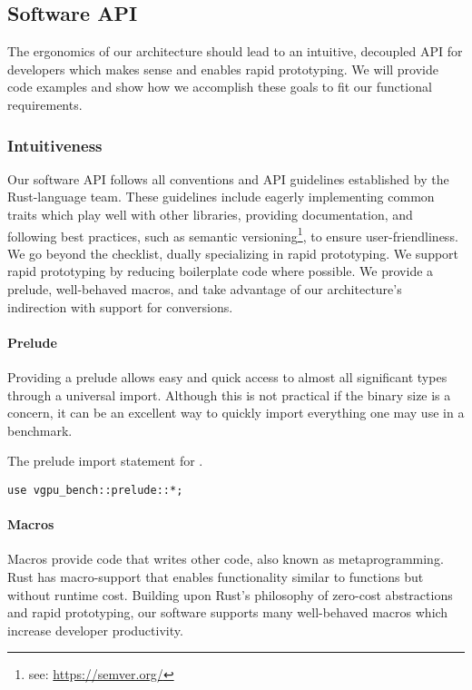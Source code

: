 \subsection{Software API}
The ergonomics of our architecture should lead to an intuitive, decoupled API for developers which makes sense and enables rapid prototyping. We will provide code examples and show how we accomplish these goals to fit our functional requirements.

\subsubsection{Intuitiveness}
Our software API follows all conventions and API guidelines established by the Rust-language team\cite{ApiGuidelines22}. These guidelines include eagerly implementing common traits which play well with other libraries, providing documentation, and following best practices, such as semantic versioning\footnote{see: \href{https://semver.org/}{https://semver.org/}}, to ensure user-friendliness. We go beyond the checklist, dually specializing in rapid prototyping. We support rapid prototyping by reducing boilerplate code where possible. We provide a prelude, well-behaved macros, and take advantage of our architecture's indirection with support for conversions.\medskip

\paragraph{Prelude}
Providing a prelude allows easy and quick access to almost all significant types through a universal import. Although this is not practical if the binary size is a concern, it can be an excellent way to quickly import everything one may use in a benchmark. 

\begin{snippet}
\caption{The prelude import statement for \toolname.}\label{code:prelude}
\begin{verbatim}
use vgpu_bench::prelude::*;
\end{verbatim}
\end{snippet}

\paragraph{Macros}\label{sec:macros}
Macros provide code that writes other code, also known as metaprogramming. Rust has macro-support that enables functionality similar to functions but without runtime cost. Building upon Rust's philosophy of zero-cost abstractions and rapid prototyping, our software supports many well-behaved macros which increase developer productivity.\medskip

